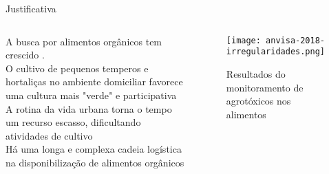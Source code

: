 \begin{frame}[t]{Justificativa} 
    \transdissolve[duration=0.5]
    \newcommand\vertspacejust{0.12cm}
        \begin{columns}[t]
                    \justifying
                    A busca por alimentos orgânicos tem crescido  \cite{sebrae:organicos}. \\ \vspace*{\vertspacejust}
                    O cultivo de pequenos temperos e hortaliças no ambiente domiciliar favorece uma cultura mais "verde" e participativa \cite{G1:pequenoagricultor} \\ \vspace*{\vertspacejust}
                    A rotina da vida urbana torna o tempo um recurso escasso, dificultando atividades de cultivo \cite{G1:3xtransito} \\ \vspace*{\vertspacejust}
                    Há uma longa e complexa cadeia logística na disponibilização de alimentos orgânicos \cite{silva:cadeiaprodutiva}  \\ \vspace*{\vertspacejust}
            
            \begin{center}
                \begin{figure}
                    \vspace{-1cm}
                    \texttt{[image: anvisa-2018-irregularidades.png]}
                    \caption{\centering Resultados do monitoramento de agrotóxicos nos alimentos \cite{ANVISA-PARA:online}}
                \end{figure}
            \end{center}
        \end{columns}
\end{frame}


